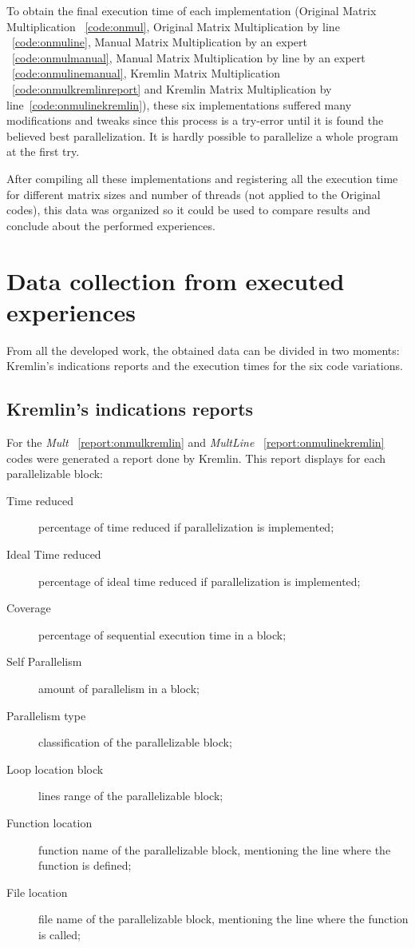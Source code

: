 To obtain the final execution time of each implementation (Original Matrix Multiplication ~\ref{code:onmul}, Original Matrix Multiplication by line ~\ref{code:onmuline}, Manual Matrix Multiplication by an expert ~\ref{code:onmulmanual}, Manual Matrix Multiplication by line by an expert ~\ref{code:onmulinemanual}, Kremlin Matrix Multiplication ~\ref{code:onmulkremlinreport} and Kremlin Matrix Multiplication by line~\ref{code:onmulinekremlin}), these six implementations suffered many modifications and tweaks since this process is a try-error until it is found the believed best parallelization. It is hardly possible to parallelize a whole program at the first try.

After compiling all these implementations and registering all the execution time for different matrix sizes and number of threads (not applied to the Original codes), this data was organized so it could be used to compare results and conclude about the performed experiences.

\section{Data collection from executed experiences}

From all the developed work, the obtained data can be divided in two moments: Kremlin's indications reports and the execution times for the six code variations.

\subsection{Kremlin's indications reports} 

For the \textit{Mult} ~\ref{report:onmulkremlin} and \textit{MultLine} ~\ref{report:onmulinekremlin} codes were generated a report done by Kremlin. This report displays for each parallelizable block:

\begin{description}
	\item[Time reduced] percentage of time reduced if parallelization is implemented;
	\item[Ideal Time reduced] percentage of  ideal time reduced if parallelization is implemented;
	\item[Coverage] percentage of sequential execution time in a block;
	\item[Self Parallelism] amount of parallelism in a block;
	\item[Parallelism type] classification of the parallelizable block;
	\item[Loop location block] lines range of the parallelizable block;
	\item[Function location] function name of the parallelizable block, mentioning the line where the function is defined;
	\item[File location] file name of the parallelizable block, mentioning the line where the function is called;
\end{description}


